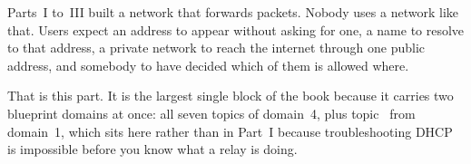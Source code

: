 
\vspace*{0.4cm}
Parts~I to~III built a network that forwards packets. Nobody uses a network like
that. Users expect an address to appear without asking for one, a name to resolve
to that address, a private network to reach the internet through one public
address, and somebody to have decided which of them is allowed where.

That is this part. It is the largest single block of the book because it carries
two blueprint domains at once: all seven topics of domain~4, plus topic~
from domain~1, which sits here rather than in Part~I because troubleshooting DHCP
is impossible before you know what a relay is doing.

